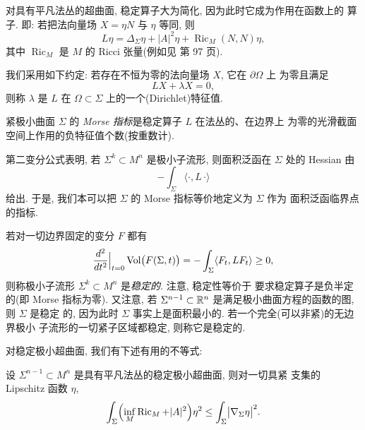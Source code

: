 对具有平凡法丛的超曲面, 稳定算子大为简化, 因为此时它成为作用在函数上的
算子. 即: 若把法向量场 $X=\eta N$ 与 $\eta$ 等同, 则
\begin{equation}
L\eta=\Delta_{\Sigma}\eta+|A|^{2}\eta
 +\operatorname{Ric}_M(N,N)\eta,
\label{eq:1.147}
\end{equation}
其中 $\operatorname{Ric}_M$ 是 $M$ 的 Ricci 张量(例如见 \cite{dC2} 第
97 页).

我们采用如下约定: 若存在不恒为零的法向量场 $X$, 它在 $\partial\Omega$ 上
为零且满足
\begin{equation}
LX+\lambda X=0,
\label{eq:1.148}
\end{equation}
则称 $\lambda$ 是 $L$ 在 $\Omega\subset\Sigma$ 上的一个(Dirichlet)特征值.

\begin{definition}
\label{def:1.31}
紧极小曲面 $\Sigma$ 的 \emph{Morse 指标}是稳定算子 $L$ 在法丛的、在边界上
为零的光滑截面空间上作用的负特征值个数(按重数计).
\end{definition}

第二变分公式表明, 若 $\Sigma^k\subset M^n$ 是极小子流形, 则面积泛函在
$\Sigma$ 处的 Hessian 由
\begin{equation}
-\int_{\Sigma}\langle\cdot,L\,\cdot\rangle
\label{eq:1.149}
\end{equation}
给出. 于是, 我们本可以把 $\Sigma$ 的 Morse 指标等价地定义为 $\Sigma$ 作为
面积泛函临界点的指标.

若对一切边界固定的变分 $F$ 都有
\begin{equation}
\frac{d^{2}}{dt^{2}}\Big|_{t=0}\operatorname{Vol}\bigl(F(\Sigma,t)\bigr)
 =-\int_{\Sigma}\langle F_t,LF_t\rangle\geq0,
\label{eq:1.150}
\end{equation}
则称极小子流形 $\Sigma^k\subset M^n$ 是\emph{稳定的}. 注意, 稳定性等价于
要求稳定算子是负半定的(即 Morse 指标为零). 又注意, 若
$\Sigma^{n-1}\subset\mathbb{R}^n$ 是满足极小曲面方程的函数的图, 则 $\Sigma$ 是稳定
的, 因为此时 $\Sigma$ 事实上是面积最小的. 若一个完全(可以非紧)的无边界极小
子流形的一切紧子区域都稳定, 则称它是稳定的.

对稳定极小超曲面, 我们有下述有用的不等式:

\begin{lemma}[稳定性不等式]
\label{lem:1.32}
设 $\Sigma^{n-1}\subset M^n$ 是具有平凡法丛的稳定极小超曲面, 则对一切具紧
支集的 Lipschitz 函数 $\eta$,
\begin{equation}
\int_{\Sigma}\Bigl(\inf_M\operatorname{Ric}_M+|A|^{2}\Bigr)\eta^{2}
 \leq\int_{\Sigma}\bigl|\nabla_{\Sigma}\eta\bigr|^{2}.
\label{eq:1.151}
\end{equation}
\end{lemma}

